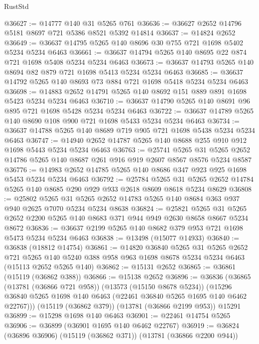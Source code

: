 \begin{lexlean}{RustStd}
\begin{coremodule}
@36627 := @14777 @140 @31 @5265 @761
@36636 := @36627 @2652 @14796 @5181 @8697 @721 @5386 @8521 @5392 @14814
@36637 := @14824 @2652
@36649 := @36637 @14795 @5265 @140 @8696 @30 @755 @721 @1698 @5402 @5234 @5234 @6463
@36661 := @36637 @14794 @5265 @140 @8695 @22 @874 @721 @1698 @5408 @5234 @5234 @6463
@36673 := @36637 @14793 @5265 @140 @8694 @82 @879 @721 @1698 @5413 @5234 @5234 @6463
@36685 := @36637 @14792 @5265 @140 @8693 @73 @884 @721 @1698 @5418 @5234 @5234 @6463
@36698 := @14883 @2652 @14791 @5265 @140 @8692 @151 @889 @891 @1698 @5423 @5234 @5234 @6463
@36710 := @36637 @14790 @5265 @140 @8691 @96 @895 @721 @1698 @5428 @5234 @5234 @6463
@36722 := @36637 @14789 @5265 @140 @8690 @108 @900 @721 @1698 @5433 @5234 @5234 @6463
@36734 := @36637 @14788 @5265 @140 @8689 @719 @905 @721 @1698 @5438 @5234 @5234 @6463
@36747 := @14940 @2652 @14787 @5265 @140 @8688 @255 @910 @912 @1698 @5443 @5234 @5234 @6463
@36763 := @25741
    @5265
    @31
    @5265
    @2652
    @14786
    @5265
    @140
    @8687
    @261
    @916
    @919
    @2607
    @8567
    @8576
    @5234
    @8587
@36776 := @14983 @2652 @14785 @5265 @140 @8686 @347 @923 @925 @1698 @5453 @5234 @5234 @6463
@36792 := @25784
    @5265
    @31
    @5265
    @2652
    @14784
    @5265
    @140
    @8685
    @290
    @929
    @933
    @2618
    @8609
    @8618
    @5234
    @8629
@36808 := @25802
    @5265
    @31
    @5265
    @2652
    @14783
    @5265
    @140
    @8684
    @363
    @937
    @940
    @2625
    @7070
    @5234
    @5234
    @8638
@36824 := @25821
    @5265
    @31
    @5265
    @2652
    @2200
    @5265
    @140
    @8683
    @371
    @944
    @949
    @2630
    @8658
    @8667
    @5234
    @8672
@36836 := @36637 @2199 @5265 @140 @8682 @379 @953 @721 @1698 @5473 @5234 @5234 @6463
@36838 := @13498 (@15077 @14933)
@36840 := @36838 (@18812 @14754)
@36861 := @14820
    @36840
    @5265
    @31
    @5265
    @2652
    @721
    @5265
    @140
    @5240
    @388
    @958
    @963
    @1698
    @8678
    @5234
    @5234
    @6463
    (@15113 @2652 @5265 @140)
@36862 := @15131 @2652
@36865 := @36861 (@15119 (@36862 @388))
@36866 := @15138 @2652
@36896 := @36836
    (@36865
      (@13781 (@36866 @721 @958))
      (@13573 (@15150 @8678 @5234))
      (@15296 @36840 @5265 @1698 @140 @6463 (@22461 @36840 @5265 @1695 @140 @6462 @22767)))
    (@15119 (@36862 @379))
    (@13781 (@36866 @2199 @953))
    @15291
@36899 := @15298 @1698 @140 @6463
@36901 := @22461 @14754 @5265
@36906 := @36899 (@36901 @1695 @140 @6462 @22767)
@36919 := @36824
    (@36896 @36906)
    (@15119 (@36862 @371))
    (@13781 (@36866 @2200 @944))

\end{coremodule}
\end{lexlean}
